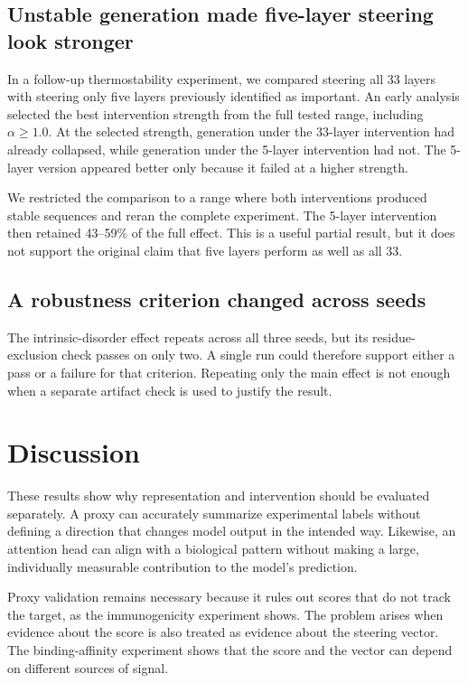 \documentclass{article}
\begin{document}
\subsection{Unstable generation made five-layer steering look stronger}
\label{sec:unstable}

In a follow-up thermostability experiment, we compared steering all 33
layers with steering only five layers previously identified as
important. An early analysis selected the best intervention strength
from the full tested range, including $\alpha\geq1.0$. At the selected
strength, generation under the 33-layer intervention had already
collapsed, while generation under the 5-layer intervention had not.
The 5-layer version appeared better only because it failed at a higher
strength.

We restricted the comparison to a range where both interventions
produced stable sequences and reran the complete experiment. The
5-layer intervention then retained 43--59\% of the full effect. This is
a useful partial result, but it does not support the original claim that
five layers perform as well as all 33.

\subsection{A robustness criterion changed across seeds}

The intrinsic-disorder effect repeats across all three seeds, but its
residue-exclusion check passes on only two. A single run could therefore
support either a pass or a failure for that criterion. Repeating only
the main effect is not enough when a separate artifact check is used to
justify the result.

\section{Discussion}

These results show why representation and intervention should be
evaluated separately. A proxy can accurately summarize experimental
labels without defining a direction that changes model output in the
intended way. Likewise, an attention head can align with a biological
pattern without making a large, individually measurable contribution to
the model's prediction.

Proxy validation remains necessary because it rules out scores that do
not track the target, as the immunogenicity experiment shows. The problem
arises when evidence about the score is also treated as evidence about
the steering vector. The binding-affinity experiment shows that the score
and the vector can depend on different sources of signal.
\end{document}
